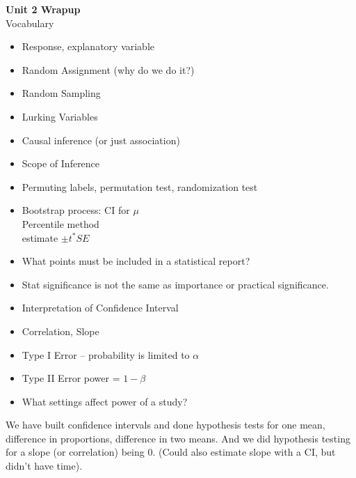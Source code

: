 \def\theTopic{Unit 2 Wrapup }
\def\dayNum{20 }

\begin{center}
\vspace*{-.2in}
{\bf {\large Unit 2 Wrapup}}\\
Vocabulary
\end{center}
\vspace{-.1in}
\begin{itemize}
  \item  Response, explanatory variable
  \item  Random Assignment (why do we do it?)
  \item  Random Sampling
  \item   Lurking Variables
  \item  Causal inference (or just association)
  \item Scope of Inference
  \item  Permuting labels, permutation test, randomization test
  \item  Bootstrap process: CI for $\mu$\\
         Percentile method\\
         estimate $\pm t^* SE$
  \item  What points must be included in a statistical report?
  \item  Stat significance is not the same as importance or practical
    significance.
  \item Interpretation of Confidence Interval
  \item Correlation, Slope
  \item  Type I Error  – probability is limited to $\alpha$
  \item  Type II Error  power = $1-\beta$ 
  \item  What settings affect power of a study?
  \end{itemize}
  
  We have built confidence intervals and done hypothesis tests for one
  mean, difference in proportions, difference in two means. And we did
  hypothesis testing for a slope (or correlation) being 0. (Could also
  estimate slope with a CI, but didn't have time).


